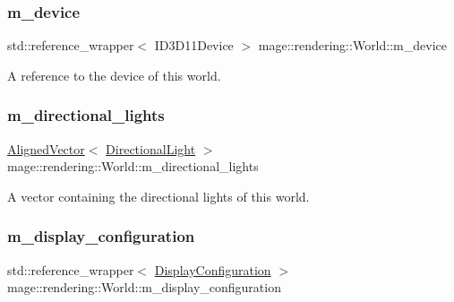 \subsubsection{\texorpdfstring{m\+\_\+device}{m\_device}}
{\footnotesize\ttfamily std\+::reference\+\_\+wrapper$<$ I\+D3\+D11\+Device $>$ mage\+::rendering\+::\+World\+::m\+\_\+device\hspace{0.3cm}{\ttfamily [private]}}

A reference to the device of this world. \mbox{\label{classmage_1_1rendering_1_1_world_a215d8925979f0cae6471315795f09cec}} 
\subsubsection{\texorpdfstring{m\+\_\+directional\+\_\+lights}{m\_directional\_lights}}
{\footnotesize\ttfamily \mbox{\hyperlink{namespacemage_a8664bfb5ce2179fc64eae9f82c8a5ba8}{Aligned\+Vector}}$<$ \mbox{\hyperlink{classmage_1_1rendering_1_1_directional_light}{Directional\+Light}} $>$ mage\+::rendering\+::\+World\+::m\+\_\+directional\+\_\+lights\hspace{0.3cm}{\ttfamily [private]}}

A vector containing the directional lights of this world. \mbox{\label{classmage_1_1rendering_1_1_world_a1a3a7ddfc44d74195e60a9177d4f2f80}} 
\subsubsection{\texorpdfstring{m\+\_\+display\+\_\+configuration}{m\_display\_configuration}}
{\footnotesize\ttfamily std\+::reference\+\_\+wrapper$<$ \mbox{\hyperlink{classmage_1_1rendering_1_1_display_configuration}{Display\+Configuration}} $>$ mage\+::rendering\+::\+World\+::m\+\_\+display\+\_\+configuration\hspace{0.3cm}{\ttfamily [private]}}

